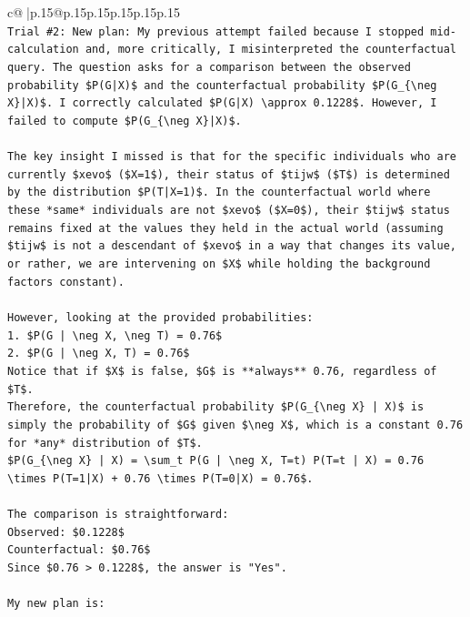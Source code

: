 \documentclass{article}
\begin{document}
{\begin{supertabular}{c@{$\;$}|p{.15\linewidth}@{}p{.15\linewidth}p{.15\linewidth}p{.15\linewidth}p{.15\linewidth}p{.15\linewidth}}
{{{\\ 
\texttt{Trial \#2: New plan: My previous attempt failed because I stopped mid{-}calculation and, more critically, I misinterpreted the counterfactual query. The question asks for a comparison between the observed probability \$P(G|X)\$ and the counterfactual probability \$P(G\_\{\textbackslash{}neg X\}|X)\$. I correctly calculated \$P(G|X) \textbackslash{}approx 0.1228\$. However, I failed to compute \$P(G\_\{\textbackslash{}neg X\}|X)\$.} \\
\\ 
\texttt{The key insight I missed is that for the specific individuals who are currently \$xevo\$ (\$X=1\$), their status of \$tijw\$ (\$T\$) is determined by the distribution \$P(T|X=1)\$. In the counterfactual world where these *same* individuals are not \$xevo\$ (\$X=0\$), their \$tijw\$ status remains fixed at the values they held in the actual world (assuming \$tijw\$ is not a descendant of \$xevo\$ in a way that changes its value, or rather, we are intervening on \$X\$ while holding the background factors constant).} \\
\\ 
\texttt{However, looking at the provided probabilities:} \\
\texttt{1.  \$P(G | \textbackslash{}neg X, \textbackslash{}neg T) = 0.76\$} \\
\texttt{2.  \$P(G | \textbackslash{}neg X, T) = 0.76\$} \\
\texttt{Notice that if \$X\$ is false, \$G\$ is **always** 0.76, regardless of \$T\$.} \\
\texttt{Therefore, the counterfactual probability \$P(G\_\{\textbackslash{}neg X\} | X)\$ is simply the probability of \$G\$ given \$\textbackslash{}neg X\$, which is a constant 0.76 for *any* distribution of \$T\$.} \\
\texttt{\$P(G\_\{\textbackslash{}neg X\} | X) = \textbackslash{}sum\_t P(G | \textbackslash{}neg X, T=t) P(T=t | X) = 0.76 \textbackslash{}times P(T=1|X) + 0.76 \textbackslash{}times P(T=0|X) = 0.76\$.} \\
\\ 
\texttt{The comparison is straightforward:} \\
\texttt{Observed: \$0.1228\$} \\
\texttt{Counterfactual: \$0.76\$} \\
\texttt{Since \$0.76 > 0.1228\$, the answer is "Yes".} \\
\\ 
\texttt{My new plan is:} \\
}}}
\end{supertabular}}
\end{document}
